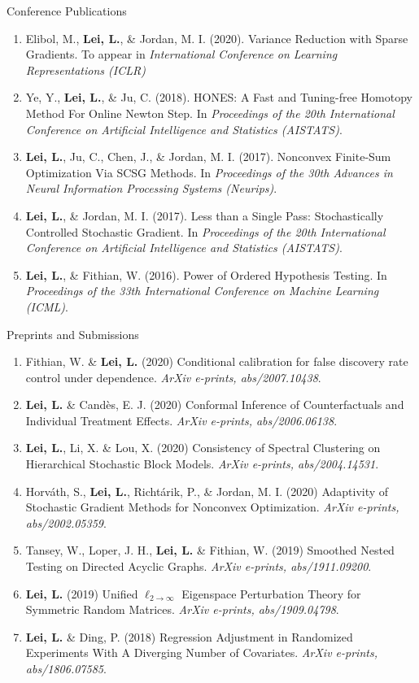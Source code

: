 \documentclass{article}
\begin{document}
\begin{large}
\noindent Conference Publications
\end{large}

\begin{enumerate}
\item Elibol, M., \textbf{Lei, L.}, \& Jordan, M. I. (2020). Variance Reduction with Sparse Gradients. To appear in \emph{International Conference on Learning Representations (ICLR)}
\item Ye, Y., \textbf{Lei, L.}, \& Ju, C. (2018). HONES: A Fast and Tuning-free Homotopy Method For Online Newton Step. In \emph{Proceedings of the 20th International Conference on Artificial Intelligence and Statistics (AISTATS)}.
\item \textbf{Lei, L.}, Ju, C., Chen, J., \& Jordan, M. I. (2017). Nonconvex Finite-Sum Optimization Via SCSG Methods. In \emph{Proceedings of the 30th Advances in Neural Information Processing Systems (Neurips)}.
\item \textbf{Lei, L.}, \& Jordan, M. I. (2017). Less than a Single Pass: Stochastically Controlled Stochastic Gradient. In \emph{Proceedings of the 20th International Conference on Artificial Intelligence and Statistics (AISTATS)}.
\item \textbf{Lei, L.}, \& Fithian, W. (2016). Power of Ordered Hypothesis Testing. In \emph{Proceedings of the 33th International Conference on Machine Learning (ICML)}.
\end{enumerate}

\begin{large}
\noindent Preprints and Submissions
\end{large}

\begin{enumerate}
\item Fithian, W. \& \textbf{Lei, L.} (2020) Conditional calibration for false discovery rate control under dependence. \emph{ArXiv e-prints, abs/2007.10438}.
\item \textbf{Lei, L.} \& Cand\`{e}s, E. J. (2020) Conformal Inference of Counterfactuals and Individual Treatment Effects. \emph{ArXiv e-prints, abs/2006.06138}.
\item \textbf{Lei, L.}, Li, X. \& Lou, X. (2020) Consistency of Spectral Clustering on Hierarchical Stochastic Block Models. \emph{ArXiv e-prints, abs/2004.14531}.
\item Horv\'{a}th, S., \textbf{Lei, L.}, Richt\'{a}rik, P., \& Jordan, M. I. (2020) Adaptivity of Stochastic Gradient Methods for Nonconvex Optimization. \emph{ArXiv e-prints, abs/2002.05359}.
\item Tansey, W., Loper, J. H., \textbf{Lei, L.} \& Fithian, W. (2019) Smoothed Nested Testing on Directed Acyclic Graphs. \emph{ArXiv e-prints, abs/1911.09200}.
\item \textbf{Lei, L.} (2019) Unified $\ell_{2\rightarrow\infty}$ Eigenspace Perturbation Theory for Symmetric Random Matrices. \emph{ArXiv e-prints, abs/1909.04798}.
\item \textbf{Lei, L.} \& Ding, P. (2018) Regression Adjustment in Randomized Experiments With A Diverging Number of Covariates. \emph{ArXiv e-prints, abs/1806.07585}.
\end{enumerate}
\end{document}
